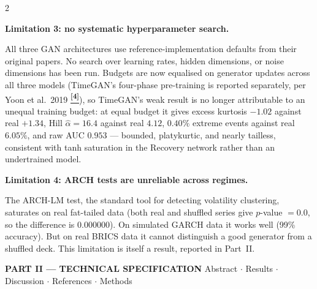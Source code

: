 \documentclass[10pt]{article}
\newcommand{\tcite}[1]{%
  \hyperlink{R:#1}{\textsuperscript{\scriptsize\textbf{[#1]}}}}
\begin{document}
\begin{multicols}{2}
{\medskip
\textbf{Limitation 3: no systematic hyperparameter search.}

All three GAN architectures use reference-implementation defaults from their original papers. No search over learning rates, hidden dimensions, or noise dimensions has been run. Budgets are now equalised on generator updates across all three models (TimeGAN's four-phase pre-training is reported separately, per Yoon et al.\ 2019\tcite{4}), so TimeGAN's weak result is no longer attributable to an unequal training budget: at equal budget it gives excess kurtosis $-1.02$ against real $+1.34$, Hill $\hat\alpha=16.4$ against real $4.12$, $0.40\%$ extreme events against real $6.05\%$, and raw AUC $0.953$ --- bounded, platykurtic, and nearly tailless, consistent with tanh saturation in the Recovery network rather than an undertrained model.

\medskip
\textbf{Limitation 4: ARCH tests are unreliable across regimes.}

The ARCH-LM test, the standard tool for detecting volatility clustering, saturates on real fat-tailed data (both real and shuffled series give $p$-value $= 0.0$, so the difference is $0.000000$). On simulated GARCH data it works well (99\% accuracy). But on real BRICS data it cannot distinguish a good generator from a shuffled deck. This limitation is itself a result, reported in Part~II.}

\end{multicols}

\clearpage



\begin{tcolorbox}[enhanced,arc=0pt,outer arc=0pt,boxrule=0pt,
  colback=Navy!10,colframe=Navy!10,top=3pt,bottom=3pt,left=8pt,right=8pt,
  before skip=0pt,after skip=6pt]
{\large\bfseries\color{Navy} PART II --- TECHNICAL SPECIFICATION}
\hfill{\small\color{Navy!70} Abstract $\cdot$ Results $\cdot$ Discussion $\cdot$ References $\cdot$ Methods}
\end{tcolorbox}
\end{document}
